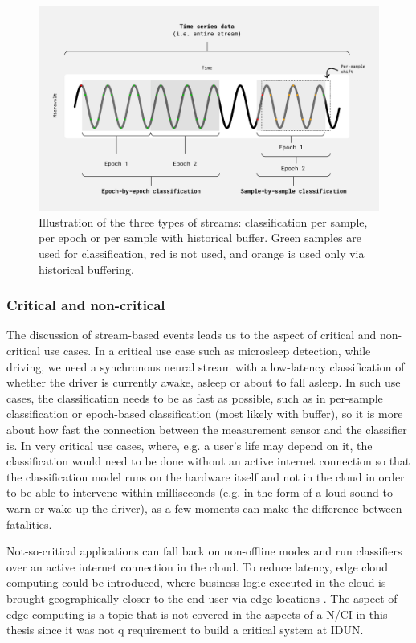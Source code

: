 \begin{figure}[!ht]
  \centering
  \includegraphics[width=\linewidth]{per-sample.png}
  \caption{Illustration of the three types of streams: classification per sample, per epoch or per sample with historical buffer. Green samples are used for classification, red is not used, and orange is used only via historical buffering.}
  \label{fig:per-sample}
\end{figure}

\subsubsection{Critical and non-critical}
\label{chapter5-critical-and-non-critical}

The discussion of stream-based events leads us to the aspect of critical and non-critical use cases. In a critical use case such as microsleep detection, while driving, we need a synchronous neural stream with a low-latency classification of whether the driver is currently awake, asleep or about to fall asleep. In such use cases, the classification needs to be as fast as possible, such as in per-sample classification or epoch-based classification (most likely with buffer), so it is more about how fast the connection between the measurement sensor and the classifier is. In very critical use cases, where, e.g. a user's life may depend on it, the classification would need to be done without an active internet connection so that the classification model runs on the hardware itself and not in the cloud in order to be able to intervene within milliseconds (e.g. in the form of a loud sound to warn or wake up the driver), as a few moments can make the difference between fatalities.

Not-so-critical applications can fall back on non-offline modes and run classifiers over an active internet connection in the cloud. To reduce latency, edge cloud computing could be introduced, where business logic executed in the cloud is brought geographically closer to the end user via edge locations \citep{nomios_what_nodate}. The aspect of edge-computing is a topic that is not covered in the aspects of a N/CI in this thesis since it was not q requirement to build a critical system at IDUN.

